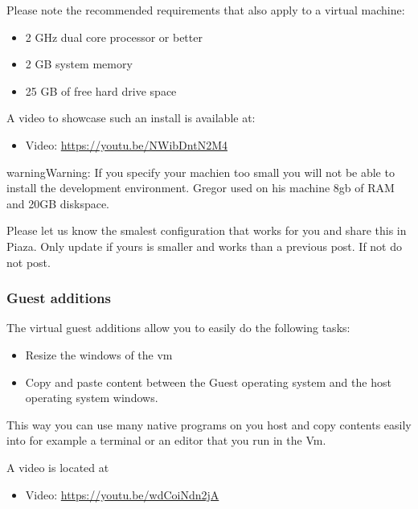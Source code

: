 Please note the recommended requirements that also apply to a virtual
machine:
\begin{itemize}
\item {} 
2 GHz dual core processor or better

\item {} 
2 GB system memory

\item {} 
25 GB of free hard drive space

\end{itemize}

A video to showcase such an install is available at:
\begin{itemize}
\item {} 
Video: \url{https://youtu.be/NWibDntN2M4}

\end{itemize}

\begin{sphinxadmonition}{warning}{Warning:}
If you specify your machien too small you will not be
able to install the development environment. Gregor
used on his machine 8gb of RAM and 20GB diskspace.

Please let us know the smalest configuration that works
for you and share this in Piaza. Only update if yours is
smaller and works than a previous post. If not do not post.
\end{sphinxadmonition}


\subsubsection{Guest additions}
\label{\detokenize{lesson/linux/virtualbox:guest-additions}}
The virtual guest additions allow you to easily do the following
tasks:
\begin{itemize}
\item {} 
Resize the windows of the vm

\item {} 
Copy and paste content between the Guest operating system and the
host operating system windows.

\end{itemize}

This way you can use many native programs on you host and copy
contents easily into for example a terminal or an editor that you run
in the Vm.

A video is located at
\begin{itemize}
\item {} 
Video: \url{https://youtu.be/wdCoiNdn2jA}

\end{itemize}

